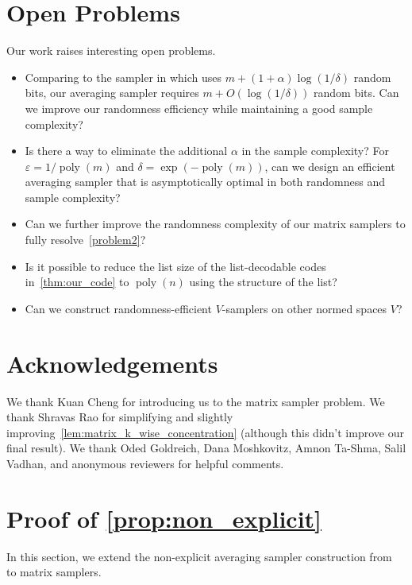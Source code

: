 \documentclass[11pt,letterpaper]{article}
\DeclareMathOperator*{\poly}{poly}
\newcommand{\eps}{\varepsilon}
\newcommand{\1}{\mathbbm{1}}
\begin{document}
\section{Open Problems}
Our work raises interesting open problems.
\begin{itemize}
    
    \item Comparing to the sampler in \cite{reingold2000entropy} which uses $m + (1 + \alpha)\log(1 / \delta)$ random bits, our averaging sampler requires $m + O(\log (1 / \delta))$ random bits. Can we improve our randomness efficiency while maintaining a good sample complexity?
    \item Is there a way to eliminate the additional $\alpha$ in the sample complexity? For $\eps = 1 / \poly(m)$ and $\delta = \exp(-\poly(m))$, can we design an efficient averaging sampler that is asymptotically optimal in both randomness and sample complexity? 
    \item Can we further improve the randomness complexity of our matrix samplers to fully resolve~\cref{problem2}? 
    \item Is it possible to reduce the list size of the list-decodable codes in~\cref{thm:our_code} to $\poly(n)$ using the structure of the list?
    \item Can we construct randomness-efficient $V$-samplers on other normed spaces $V$? 
\end{itemize}


\section*{Acknowledgements}

We thank Kuan Cheng for introducing us to the matrix sampler problem. We thank Shravas Rao for simplifying and slightly improving~\cref{lem:matrix_k_wise_concentration} (although this didn't improve our final result). We thank Oded Goldreich, Dana Moshkovitz, Amnon Ta-Shma, Salil Vadhan, and anonymous reviewers for helpful comments. 

\printbibliography

\appendix

\section{Proof of \cref{prop:non_explicit}}
\label{sec:non_explicit}

In this section, we extend the non-explicit averaging sampler construction from~\cite{CEG95} to matrix samplers.
\end{document}

